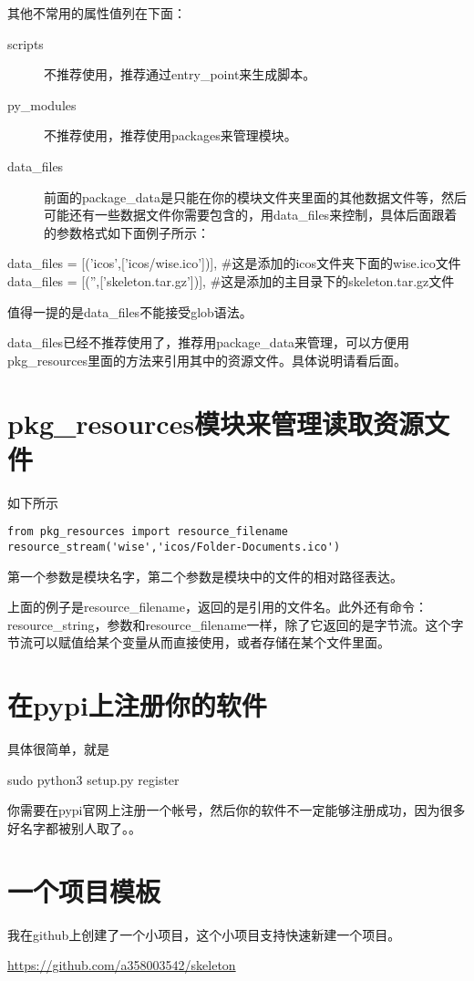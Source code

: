 \documentclass[11pt,oneside]{article}
\begin{document}
其他不常用的属性值列在下面：
\begin{description}
\item[{scripts}] 不推荐使用，推荐通过entry\_point来生成脚本。
\item[{py\_modules}] 不推荐使用，推荐使用packages来管理模块。
\item[{data\_files}] 前面的package\_data是只能在你的模块文件夹里面的其他数据文件等，然后可能还有一些数据文件你需要包含的，用data\_files来控制，具体后面跟着的参数格式如下面例子所示：
\end{description}
\begin{tcbpython}
data_files = [('icos',['icos/wise.ico'])],
#这是添加的icos文件夹下面的wise.ico文件
data_files = [('',['skeleton.tar.gz'])],
#这是添加的主目录下的skeleton.tar.gz文件
\end{tcbpython}

值得一提的是data\_files不能接受glob语法。

data\_files已经不推荐使用了，推荐用package\_data来管理，可以方便用pkg\_resources里面的方法来引用其中的资源文件。具体说明请看后面。


\section{pkg\_resources模块来管理读取资源文件}
\label{sec-3}
如下所示
\begin{Verbatim}
from pkg_resources import resource_filename
resource_stream('wise','icos/Folder-Documents.ico')
\end{Verbatim}

第一个参数是模块名字，第二个参数是模块中的文件的相对路径表达。

上面的例子是resource\_filename，返回的是引用的文件名。此外还有命令：resource\_string，参数和resource\_filename一样，除了它返回的是字节流。这个字节流可以赋值给某个变量从而直接使用，或者存储在某个文件里面。


\section{在pypi上注册你的软件}
\label{sec-4}
具体很简单，就是
\begin{tcbbash}
sudo python3 setup.py register
\end{tcbbash}

你需要在pypi官网上注册一个帐号，然后你的软件不一定能够注册成功，因为很多好名字都被别人取了。。

\section{一个项目模板}
\label{sec-5}
我在github上创建了一个小项目，这个小项目支持快速新建一个项目。

\href{https://github.com/a358003542/skeleton}{\url{https://github.com/a358003542/skeleton}} 
\end{document}
